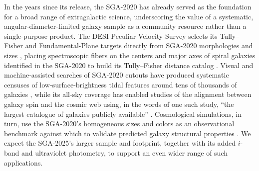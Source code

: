 \documentclass[modern,linenumbers]{aastex701}
\begin{document}
In the years since its release, the SGA-2020 has already served as the
foundation for a broad range of extragalactic science, underscoring the
value of a systematic, angular-diameter-limited galaxy sample as a
community resource rather than a single-purpose product. The DESI
Peculiar Velocity Survey selects its Tully--Fisher and Fundamental-Plane
targets directly from SGA-2020 morphologies and sizes
\citep{saulder23a}, placing spectroscopic fibers on the centers and
major axes of spiral galaxies identified in the SGA-2020 to build its
Tully--Fisher distance catalog \citep{douglass26a}. Visual and
machine-assisted searches of SGA-2020
cutouts have produced systematic censuses of low-surface-brightness
tidal features around tens of thousands of galaxies \citep{sola25a},
while its all-sky coverage has enabled studies of the alignment between
galaxy spin and the cosmic web using, in the words of one such study,
``the largest catalogue of galaxies publicly available''
\citep{muralichandran25a}. Cosmological simulations, in turn, use the
SGA-2020's homogeneous sizes and colors as an observational benchmark
against which to validate predicted galaxy structural properties
\citep{baes24a, baes24b}. We expect the SGA-2025's larger sample and
footprint, together with its added $i$-band and ultraviolet photometry,
to support an even wider range of such applications.
\end{document}
